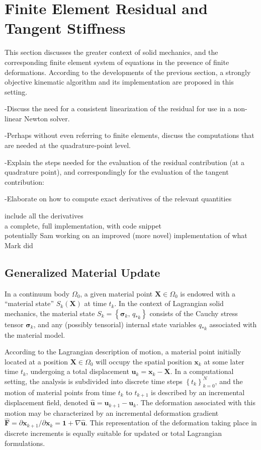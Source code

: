 \section{Finite Element Residual and Tangent Stiffness}
%

This section discusses the greater context of solid mechanics, and the corresponding finite element system of equations in the presence of finite deformations. According to the developments of the previous section, a strongly objective kinematic algorithm and its implementation are proposed in this setting.

-Discuss the need for a consistent linearization of the residual for use in a non-linear Newton solver.

-Perhaps without even referring to finite elements, discuss the computations that are needed at the quadrature-point level.

-Explain the steps needed for the evaluation of the residual contribution (at a quadrature point), and correspondingly for the evaluation of the tangent contribution:

-Elaborate on how to compute exact derivatives of the relevant quantities

include all the derivatives\\
a complete, full implementation, with code snippet\\
potentially Sam working on an improved (more novel) implementation of what Mark did\\

\subsection{Generalized Material Update}

In a continuum body $\Omega_0$, a given material point $\mathbf{X} \in \Omega_0$ is endowed with a ``material state'' $S_k (\mathbf{X})$ at time $t_k$. In the context of Lagrangian solid mechanics, the material state $S_k = \left\{ \boldsymbol{\sigma}_{k}, \, q_{*k} \right\}$ consists of the Cauchy stress tensor $\boldsymbol{\sigma}_{k}$, and any (possibly tensorial) internal state variables $q_{*k}$ associated with the material model.

According to the Lagrangian description of motion, a material point initially located at a position $\mathbf{X} \in \Omega_0$ will occupy the spatial position $\mathbf{x}_k$ at some later time $t_k$, undergoing a total displacement $\mathbf{u}_k = \mathbf{x}_k - \mathbf{X}$. In a computational setting, the analysis is subdivided into discrete time steps $\left\{ t_k \right\}_{k=0}^N$, and the motion of material points from time $t_k$ to $t_{k+1}$ is described by an incremental displacement field, denoted $\hat{\mathbf{u}} = \mathbf{u}_{k+1} - \mathbf{u}_{k}$. The deformation associated with this motion may be characterized by an incremental deformation gradient $\hat{\mathbf{F}} = \partial \mathbf{x}_{k+1} / \partial \mathbf{x}_k = \mathbf{1} + \nabla \hat{\mathbf{u}}$. This representation of the deformation taking place in discrete increments is equally suitable for updated or total Lagrangian formulations.

